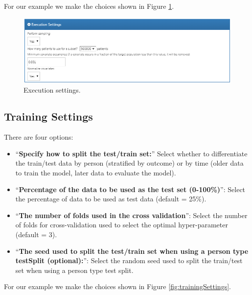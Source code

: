 \documentclass[11pt]{book}
\providecommand{\tightlist}{%
  \setlength{\itemsep}{0pt}\setlength{\parskip}{0pt}}
\theoremstyle{definition}
\theoremstyle{definition}
\theoremstyle{definition}
\theoremstyle{remark}
\begin{document}
For our example we make the choices shown in Figure
\ref{fig:executionSettings}.

\begin{figure}

{\centering \includegraphics[width=1\linewidth]{images/PatientLevelPrediction/executionSettings} 

}

\caption{Execution settings.}\label{fig:executionSettings}
\end{figure}

\subsection{Training Settings}\label{training-settings}

There are four options:

\begin{itemize}
\tightlist
\item
  ``\textbf{Specify how to split the test/train set:}'' Select whether
  to differentiate the train/test data by person (stratified by outcome)
  or by time (older data to train the model, later data to evaluate the
  model).
\item
  ``\textbf{Percentage of the data to be used as the test set
  (0-100\%)}'': Select the percentage of data to be used as test data
  (default = 25\%).
\item
  ``\textbf{The number of folds used in the cross validation}'': Select
  the number of folds for cross-validation used to select the optimal
  hyper-parameter (default = 3).
\item
  ``\textbf{The seed used to split the test/train set when using a
  person type testSplit (optional):}'': Select the random seed used to
  split the train/test set when using a person type test split.
\end{itemize}

For our example we make the choices shown in Figure
\ref{fig:trainingSettings}.
\end{document}
